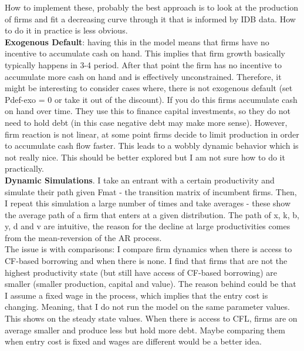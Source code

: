 \documentclass[12pt]{article}
\begin{document}
How to implement these, probably the best approach is to look at the production of firms and fit a decreasing curve through it that is informed by IDB data. How to do it in practice is less obvious. \vspace{3mm} \\
\textbf{Exogenous Default}: having this in the model means that firms have no incentive to accumulate cash on hand. This implies that firm growth basically typically happens in 3-4 period. After that point the firm has no incentive to accumulate more cash on hand and is effectively unconstrained. Therefore, it might be interesting to consider cases where, there is not exogenous default (set Pdef-exo = 0 or take it out of the discount). If you do this firms accumulate cash on hand over time. They use this to finance capital investments, so they do not need to hold debt (in this case negative debt may make more sense). However, firm reaction is not linear, at some point firms decide to limit production in order to accumulate cash flow faster. This leads to a wobbly dynamic behavior which is not really nice. This should be better explored but I am not sure how to do it practically. \vspace{3mm} \\
\textbf{Dynamic Simulations}. I take an entrant with a certain productivity and simulate their path given Fmat - the transition matrix of incumbent firms. Then, I repeat this simulation a large number of times and take averages - these show the average path of a firm that enters at a given distribution. The path of x, k, b, y, d and v  are intuitive, the reason for the decline at large productivities comes from the mean-reversion of the AR process. \vspace{3mm} \\
The issue is with comparisons: I compare firm dynamics when there is access to CF-based borrowing and when there is none. I find that firms that are not the highest productivity state (but still have access of CF-based borrowing) are smaller (smaller production, capital and value). The reason behind could be that I assume a fixed wage in the process, which implies that the entry cost is changing. Meaning, that I do not run the model on the same parameter values. This shows on the steady state values.  When there is access to CFL, firms are on average smaller and produce less but hold more debt. Maybe comparing them when entry cost is fixed and wages are different would be a better idea. \vspace{3mm} \\
\end{document}
